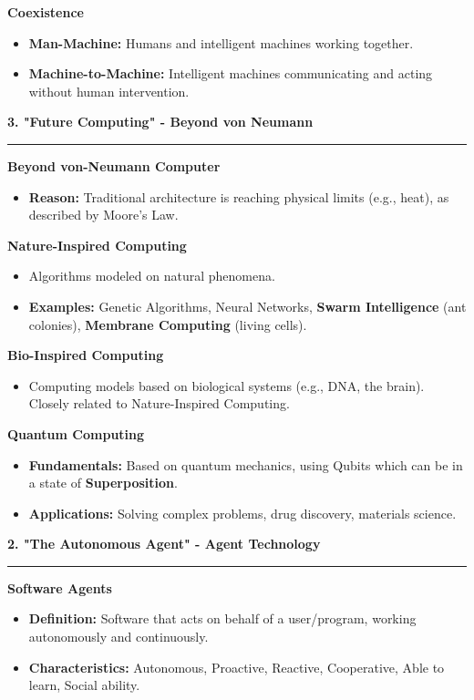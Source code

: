 \documentclass[a4paper, 8pt]{extarticle}
\newcommand{\sectionheading}[1]{\large\textbf{#1}\par\noindent\rule{\linewidth}{0.4pt}}
\newcommand{\subsectionheading}[1]{\normalsize\textbf{#1}}
\begin{document}
\begin{multicols}{2}
\subsectionheading{Coexistence}
\begin{itemize}
    \item \textbf{Man-Machine:} Humans and intelligent machines working together.
    \item \textbf{Machine-to-Machine:} Intelligent machines communicating and acting without human intervention.
\end{itemize}

\vspace{1em}
\sectionheading{3. "Future Computing" - Beyond von Neumann}
\vspace{0.5em}
\subsectionheading{Beyond von-Neumann Computer}
\begin{itemize}
    \item \textbf{Reason:} Traditional architecture is reaching physical limits (e.g., heat), as described by Moore's Law.
\end{itemize}

\subsectionheading{Nature-Inspired Computing}
\begin{itemize}
    \item Algorithms modeled on natural phenomena.
    \item \textbf{Examples:} Genetic Algorithms, Neural Networks, \textbf{Swarm Intelligence} (ant colonies), \textbf{Membrane Computing} (living cells).
\end{itemize}

\subsectionheading{Bio-Inspired Computing}
\begin{itemize}
    \item Computing models based on biological systems (e.g., DNA, the brain). Closely related to Nature-Inspired Computing.
\end{itemize}

\subsectionheading{Quantum Computing}
\begin{itemize}
    \item \textbf{Fundamentals:} Based on quantum mechanics, using Qubits which can be in a state of \textbf{Superposition}.
    \item \textbf{Applications:} Solving complex problems, drug discovery, materials science.
\end{itemize}


\columnbreak %


\sectionheading{2. "The Autonomous Agent" - Agent Technology}
\vspace{0.5em}
\subsectionheading{Software Agents}
\begin{itemize}
    \item \textbf{Definition:} Software that acts on behalf of a user/program, working autonomously and continuously.
    \item \textbf{Characteristics:} Autonomous, Proactive, Reactive, Cooperative, Able to learn, Social ability.
\end{itemize}


\end{multicols}
\end{document}
